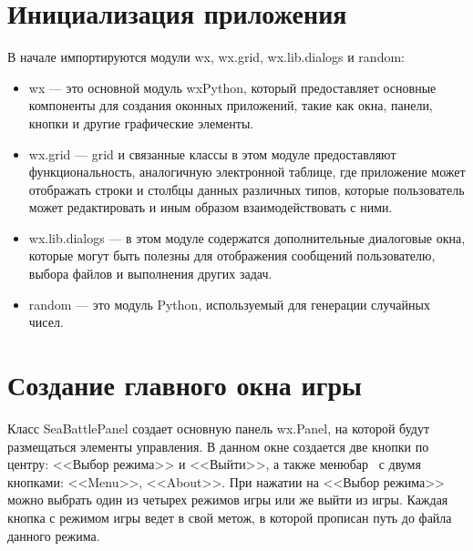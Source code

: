 \section{\label{sec:ch02/sec02}Инициализация приложения}
В начале импортируются модули wx, wx.grid, wx.lib.dialogs и random:
\begin{itemize}
\item wx --- это основной модуль wxPython, который предоставляет основные компоненты для создания оконных приложений, такие как окна, панели, кнопки и другие графические элементы.
\item wx.grid --- grid и связанные классы в этом модуле предоставляют функциональность, аналогичную электронной таблице, где приложение может отображать строки и столбцы данных различных типов, которые пользователь может редактировать и иным образом взаимодействовать с ними.
\item wx.lib.dialogs --- в этом модуле содержатся дополнительные диалоговые окна, которые могут быть полезны для отображения сообщений пользователю, выбора файлов и выполнения других задач.
\item random --- это модуль Python, используемый для генерации случайных чисел.
\end{itemize}

\section{\label{sec:ch02/sec03}Создание главного окна игры}
Класс SeaBattlePanel создает основную панель wx.Panel, на которой будут размещаться элементы управления. В данном окне создается две кнопки по центру: <<Выбор режима>> и <<Выйти>>, а также менюбар~\cite{p7} с двумя кнопками: <<Menu>>, <<About>>. 
При нажатии на <<Выбор режима>> можно выбрать один из четырех режимов игры или же выйти из игры.
Каждая кнопка с режимом игры ведет в свой метож, в которой прописан путь до файла данного режима.

